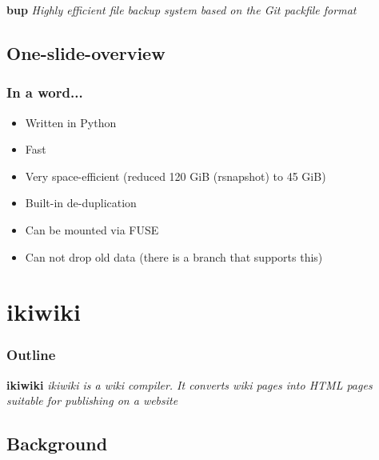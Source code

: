 \documentclass[t]{beamer}
\begin{document}
\begin{frame}
		\begin{center}
			\vfill
			\vfill
			\textbf{bup}
			\vfill
			\textit{Highly efficient file backup system based on the Git packfile format}
			\vfill
			\vfill
		\end{center}
\end{frame}

\subsection{One-slide-overview}

\begin{frame}
	\frametitle{In a word...}
	\begin{itemize}
		\item Written in Python
		\item Fast
		\item Very space-efficient (reduced 120 GiB (rsnapshot) to 45 GiB)
		\item Built-in de-duplication
		\item Can be mounted via FUSE
		\item Can not drop old data (there is a branch that supports this)
	\end{itemize}
\end{frame}


\section{ikiwiki}

\begin{frame}
	\frametitle{Outline}
	\tableofcontents[currentsection]
\end{frame}

\begin{frame}
		\begin{center}
			\vfill
			\vfill
			\textbf{ikiwiki}
			\vfill
			\textit{ikiwiki is a wiki compiler. It converts wiki pages into HTML pages suitable for publishing on a website}
			\vfill
			\vfill
		\end{center}
\end{frame}

\subsection{Background}
\end{document}
